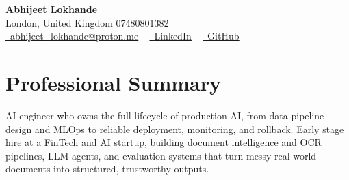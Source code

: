 \documentclass[a4paper,10pt]{article}
\begin{document}
    \begin{center}
        {\Huge\bfseries Abhijeet Lokhande}
        \\[2pt] {\color{muted}London, United Kingdom \textbar{} 07480801382}\\
        \small
        \href{mailto:abhijeet_lokhande@proton.me}{\raisebox{-0.2\height}{\color{primary}\faEnvelope}\  \underline{abhijeet\_lokhande@proton.me}} ~
        \href{https://www.linkedin.com/in/ablds/}{\raisebox{-0.2\height}{\color{primary}\faLinkedin}\ \underline{LinkedIn}}  ~
        \href{https://github.com/abhijeetscode}{\raisebox{-0.2\height}{\color{primary}\faGithub}\ \underline{GitHub}}
    \end{center}

\section{Professional Summary}
\vspace{-5pt}
{\color{muted}AI engineer who owns the full lifecycle of production AI, from data pipeline design and MLOps to reliable deployment, monitoring, and rollback. Early stage hire at a FinTech and AI startup, building document intelligence and OCR pipelines, LLM agents, and evaluation systems that turn messy real world documents into structured, trustworthy outputs.}
\vspace{2pt}

\end{document}

